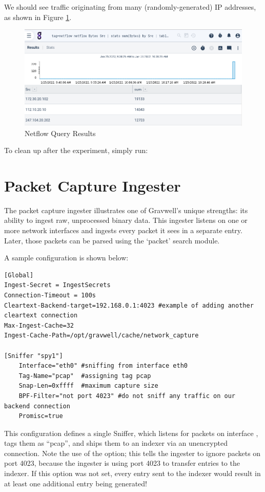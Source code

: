 We should see traffic originating from many (randomly-generated) IP addresses, as shown in Figure \ref{fig:netflow-lab}.

\begin{figure}
	\includegraphics{images/igst-netflow-lab.png}
	\caption{Netflow Query Results}
	\label{fig:netflow-lab}
\end{figure}

To clean up after the experiment, simply run:





\section{Packet Capture Ingester}
The packet capture ingester illustrates one of Gravwell's unique
strengths: its ability to ingest raw, unprocessed binary data. This
ingester listens on one or more network interfaces and ingests every
packet it sees in a separate entry. Later, those packets can be parsed
using the `packet' search module.

A sample configuration is shown below:

\begin{Verbatim}[breaklines=true]
[Global]
Ingest-Secret = IngestSecrets
Connection-Timeout = 100s
Cleartext-Backend-target=192.168.0.1:4023 #example of adding another cleartext connection
Max-Ingest-Cache=32
Ingest-Cache-Path=/opt/gravwell/cache/network_capture

[Sniffer "spy1"]
    Interface="eth0" #sniffing from interface eth0
    Tag-Name="pcap"  #assigning tag pcap
    Snap-Len=0xffff  #maximum capture size
    BPF-Filter="not port 4023" #do not sniff any traffic on our backend connection
    Promisc=true
\end{Verbatim}

This configuration defines a single Sniffer, which listens for packets
on interface , tags them as ``pcap'', and ships them to an
indexer via an unencrypted connection. Note the use of the
 option; this tells the ingester to ignore packets on port
4023, because the ingester is using port 4023 to transfer entries to the
indexer. If this option was not set, every entry sent to the indexer
would result in at least one additional entry being generated!

